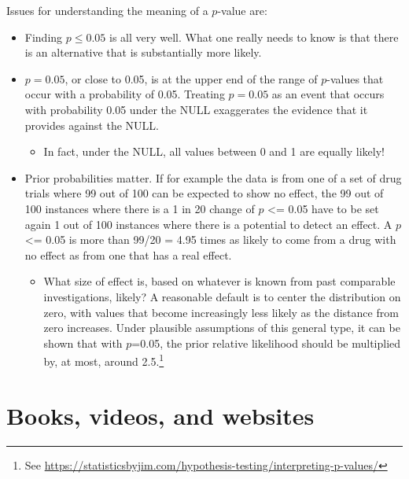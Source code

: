 \documentclass[
  10pt,
  b5paper]{book}
\providecommand{\tightlist}{%
  \setlength{\itemsep}{0pt}\setlength{\parskip}{0pt}}
\begin{document}
Issues for understanding the meaning of a \(p\)-value are:

\begin{itemize}
\tightlist
\item
  Finding \(p \leq 0.05\) is all very well. What one really needs to know is that there is an alternative that is substantially more likely.
\item
  \(p = 0.05\), or close to 0.05, is at the upper end of the range of \(p\)-values that occur with a probability of 0.05. Treating \(p = 0.05\) as an event that occurs with probability 0.05 under the NULL exaggerates the evidence that it provides against the NULL.

  \begin{itemize}
  \tightlist
  \item
    In fact, under the NULL, all values between 0 and 1 are equally likely!
  \end{itemize}
\item
  Prior probabilities matter. If for example the data is from one of a set of drug trials where 99 out of 100 can be expected to show no effect, the 99 out of 100 instances where there is a 1 in 20 change of \(p\) \textless= 0.05 have to be set again 1 out of 100 instances where there is a potential to detect an effect. A \(p\) \textless= 0.05 is more than 99/20 = 4.95 times as likely to come from a drug with no effect as from one that has a real effect.

  \begin{itemize}
  \tightlist
  \item
    What size of effect is, based on whatever is known from past comparable investigations, likely? A reasonable default is to center the distribution on zero, with values that become increasingly less likely as the distance from zero increases. Under plausible assumptions of this general type, it can be shown that with \(p\)=0.05, the prior relative likelihood should be multiplied by, at most, around 2.5.\footnote{See \url{https://statisticsbyjim.com/hypothesis-testing/interpreting-p-values/}}
  \end{itemize}
\end{itemize}

\backmatter

\hypertarget{app:more}{%
\chapter{Books, videos, and websites}\label{app:more}}
\end{document}
